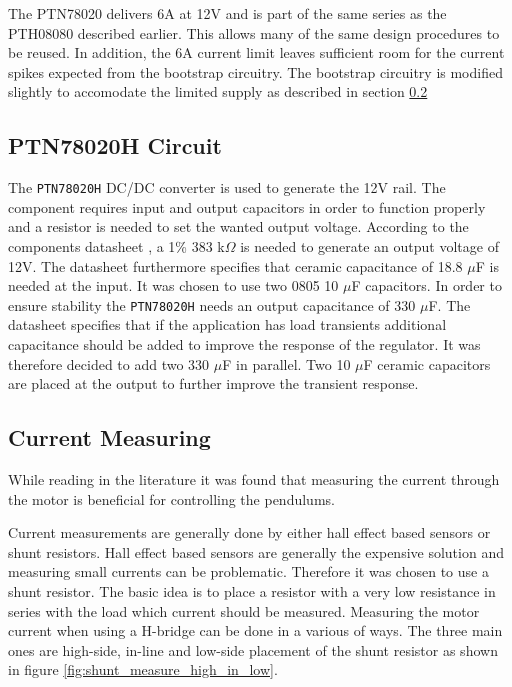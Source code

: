 The PTN78020 delivers 6A at 12V and is part of the same series as the PTH08080 described earlier.
This allows many of the same design procedures to be reused.
In addition, the 6A current limit leaves sufficient room for the current spikes expected from the bootstrap circuitry.
The bootstrap circuitry is modified slightly to accomodate the limited supply as described in section \ref{}




\subsection{PTN78020H Circuit}
The \texttt{PTN78020H} DC/DC converter is used to generate the 12V rail. 
The component requires input and output capacitors in order to function properly and a resistor is needed to set the wanted output voltage. 
According to the components datasheet \cite{PTN78020H}, a 1\% 383 k$\Omega$ is needed to generate an output voltage of 12V.
The datasheet furthermore specifies that ceramic capacitance of 18.8 $\mu$F is needed at the input. 
It was chosen to use two 0805 10 $\mu$F capacitors.
In order to ensure stability the \texttt{PTN78020H} needs an output capacitance of 330 $\mu$F.
The datasheet specifies that if the application has load transients additional capacitance should be added to improve the response of the regulator. 
It was therefore decided to add two 330 $\mu$F in parallel. 
Two 10 $\mu$F ceramic capacitors are placed at the output to further improve the transient response. 



\subsection{Current Measuring}
While reading in the literature it was found that measuring the current through the motor is beneficial for controlling the pendulums.

Current measurements are generally done by either hall effect based sensors or shunt resistors. 
Hall effect based sensors are generally the expensive solution and measuring small currents can be problematic. 
Therefore it was chosen to use a shunt resistor.
The basic idea is to place a resistor with a very low resistance in series with the load which current should be measured. 
Measuring the motor current when using a H-bridge can be done in a various of ways.
The three main ones are high-side, in-line and low-side placement of the shunt resistor as shown in figure \ref{fig:shunt_measure_high_in_low}.

